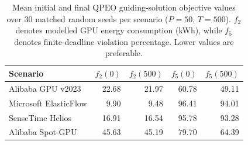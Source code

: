 \begin{table}[!htbp]
\centering
\footnotesize
\renewcommand{\arraystretch}{1.12}
\setlength{\tabcolsep}{4pt}
\caption{Mean initial and final QPEO guiding-solution objective values over 30 matched random seeds per scenario ($P=50$, $T=500$). $f_2$ denotes modelled GPU energy consumption (kWh), while $f_5$ denotes finite-deadline violation percentage. Lower values are preferable.}
\label{tab:guide_trajectory}
\begin{tabular}{lrrrr}
\toprule
\textbf{Scenario} & \textbf{$f_2(0)$} & \textbf{$f_2(500)$} & \textbf{$f_5(0)$} & \textbf{$f_5(500)$} \\
\midrule
Alibaba GPU v2023 & 22.68 & 21.97 & 60.78 & 49.11 \\
Microsoft ElasticFlow & 9.90 & 9.48 & 96.41 & 94.01 \\
SenseTime Helios & 16.91 & 16.54 & 95.78 & 93.28 \\
Alibaba Spot-GPU & 45.63 & 45.19 & 79.70 & 64.39 \\
\bottomrule
\end{tabular}
\end{table}
